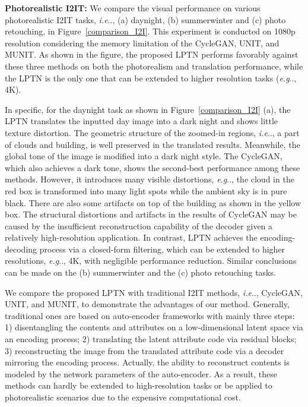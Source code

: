 \documentclass[10pt,twocolumn,letterpaper]{article}
\makeatletter
\DeclareRobustCommand\onedot{\futurelet\@let@token\@onedot}
\def\@onedot{\ifx\@let@token.\else.\null\fi\xspace}
\def\eg{\emph{e.g}\onedot} \def\Eg{\emph{E.g}\onedot}
\def\ie{\emph{i.e}\onedot} \def\Ie{\emph{I.e}\onedot}
\makeatother
\begin{document}
	\noindent\textbf{Photorealistic I2IT: } We compare the visual performance on various photorealistic I2IT tasks, \ie, (a) daynight, (b) summerwinter and (c) photo retouching, in Figure~\ref{comparison_I2I}. This experiment is conducted on 1080p resolution considering the memory limitation of the CycleGAN, UNIT, and MUNIT. As shown in the figure, the proposed LPTN performs favorably against these three methods on both the photorealism and translation performance, while the LPTN is the only one that can be extended to higher resolution tasks (\eg, 4K).
	
	In specific, for the daynight task as shown in Figure~\ref{comparison_I2I} (a), the LPTN translates the inputted day image into a dark night and shows little texture distortion. The geometric structure of the zoomed-in regions, \ie, a part of clouds and building, is well preserved in the translated results. Meanwhile, the global tone of the image is modified into a dark night style. The CycleGAN, which also achieves a dark tone, shows the second-best performance among these methods. However, it introduces many visible distortions, \eg, the cloud in the red box is transformed into many light spots while the ambient sky is in pure black. There are also some artifacts on top of the building as shown in the yellow box. The structural distortions and artifacts in the results of CycleGAN may be caused by the insufficient reconstruction capability of the decoder given a relatively high-resolution application. In contrast, LPTN achieves the encoding-decoding process via a closed-form filtering, which can be extended to higher resolutions, \eg, 4K, with negligible performance reduction. Similar conclusions can be made on the (b) summerwinter and the (c) photo retouching tasks.
	
	We compare the proposed LPTN with traditional I2IT methods, \ie, CycleGAN, UNIT, and MUNIT, to demonstrate the advantages of our method. Generally, traditional ones are based on auto-encoder frameworks with mainly three steps: 1) disentangling the contents and attributes on a low-dimensional latent space via an encoding process; 2) translating the latent attribute code via residual blocks; 3) reconstructing the image from the translated attribute code via a decoder mirroring the encoding process. Actually, the ability to reconstruct contents is modeled by the network parameters of the auto-encoder. As a result, these methods can hardly be extended to high-resolution tasks or be applied to photorealistic scenarios due to the expensive computational cost.
	
\end{document}
